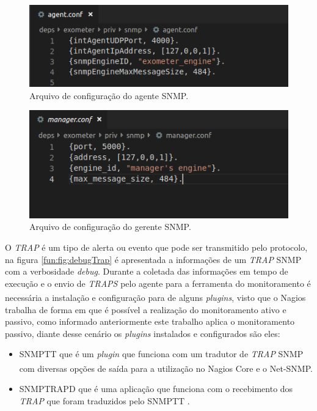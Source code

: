 \begin{figure}[h!]
	\begin{center}
	\includegraphics[scale = 0.99]{img/agenteConfig.png}
	\caption{Arquivo de configuração do agente \acrshort{SNMP}.}
	\label{fun:fig:agenteConfig}
	\end{center}
\end{figure}

\begin{figure}[h!]
	\begin{center}
	\includegraphics[scale = 0.99]{img/gerenteConfig.png}
	\caption{Arquivo de configuração do gerente \acrshort{SNMP}.}
	\label{fun:fig:gerenteConfig}
	\end{center}
\end{figure}


O \textit{TRAP} é um tipo de alerta ou evento que pode ser transmitido pelo protocolo, na figura \ref{fun:fig:debugTrap} é apresentada a informações de um \textit{TRAP} \acrshort{SNMP} com a verbosidade \textit{debug}. Durante a coletada das informações em tempo de execução e o envio de \textit{TRAPS} pelo agente para a ferramenta do monitoramento é necessária a instalação e configuração para de alguns \textit{plugins}, visto que o Nagios\textsuperscript{\textregistered} trabalha de forma em que é possível a realização do monitoramento ativo e passivo, como informado anteriormente este trabalho aplica o monitoramento passivo, diante desse cenário os \textit{plugins} instalados e configurados são eles:
\begin{itemize}
\item \acrfull{SNMPTT} que é um \textit{plugin} que funciona com um tradutor de \textit{TRAP} \acrshort{SNMP} com diversas opções de saída para a utilização no Nagios Core\textsuperscript{\textregistered} e o Net-SNMP\cite{nagiosCoreSNMPTT}.
\item SNMPTRAPD que é uma aplicação que funciona com o recebimento dos \textit{TRAP} que foram traduzidos pelo \acrshort{SNMPTT} \cite{net_snmptrapd}.
\end{itemize}

